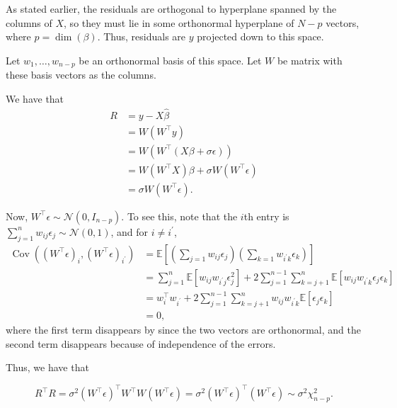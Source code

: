 \documentclass[letterpaper,11pt]{article}
\begin{document}
\begin{enumerate}
\begin{enumerate}
\begin{description}
      As stated earlier, the residuals are orthogonal to hyperplane spanned by
      the columns of $X$, so they must lie in some orthonormal hyperplane of
      $N - p$ vectors, where $p = \dim(\beta)$. Thus, residuals are $y$
      projected down to this space.

      Let $w_1,\ldots,w_{n-p}$ be an orthonormal basis of this space. Let $W$ be
      matrix with these basis vectors as the columns.

      We have that
      \begin{align}
        R &= y - X\hat{\beta} \nonumber\\
          &= W\left(W^\intercal y\right) \nonumber\\
          &= W\left(W^\intercal\left(X\beta + \sigma\epsilon\right)\right) \nonumber\\
          &= W\left(W^\intercal X\right)\beta + \sigma W\left(W^\intercal\epsilon\right) \nonumber\\
          &= \sigma W\left(W^\intercal\epsilon\right).
      \end{align}

      Now, $W^\intercal\epsilon \sim \mathcal{N}\left(0, I_{n-p}\right)$. To see
      this, note that the $i$th entry is
      $\sum_{j=1}^n w_{ij}\epsilon_j \sim \mathcal{N}\left(0, 1\right)$, and for
      $i \neq i^\prime$,
      \begin{align*}
        \operatorname{Cov}\left(
        \left(W^\intercal\epsilon\right)_i, \left(W^\intercal\epsilon\right)_{i^\prime}\right)
        &=
          \mathbb{E}\left[
          \left(\sum_{j=1}w_{ij}\epsilon_j\right)\left(\sum_{k=1}w_{i^\prime k}\epsilon_k\right)
          \right] \\
        &= \sum_{j=1}^n\mathbb{E}\left[w_{ij}w_{i^\prime j} \epsilon_j^2\right] +
          2\sum_{j=1}^{n-1}\sum_{k=j+1}^n \mathbb{E}\left[w_{ij}w_{i^\prime k} \epsilon_j\epsilon_k\right] \\
        &= w_i^\intercal w_{i^\prime} + 2\sum_{j=1}^{n-1}\sum_{k=j+1}^n w_{ij}w_{i^\prime k}
          \mathbb{E}\left[\epsilon_j\epsilon_k\right] \\
        &= 0,
      \end{align*}
      where the first term disappears by since the two vectors are orthonormal,
      and the second term disappears because of independence of the errors.

      Thus, we have that

      \begin{equation}
        R^\intercal R
        = \sigma^2 \left(W^\intercal\epsilon\right)^\intercal W^\intercal W \left(W^\intercal\epsilon\right)
        = \sigma^2 \left(W^\intercal\epsilon\right)^\intercal\left(W^\intercal\epsilon\right)
        \sim \sigma^2 \chi^2_{n-p}.
        \label{eqn:p1_residual_distribution}
      \end{equation}


\end{description}
\end{enumerate}
\end{enumerate}
\end{document}
